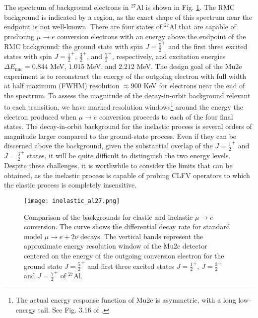 \documentclass{book}[letterpaper,12pt]
\begin{document}
The spectrum of background electrons in $^{27}$Al is shown in Fig. \ref{fig:backgrounds}. The RMC background is indicated by a region, as the exact shape of this spectrum near the endpoint is not well-known. There are four states of $^{27}$Al that are capable of producing $\mu\rightarrow e$ conversion electrons with an energy above the endpoint of the RMC background: the ground state with spin $J=\frac{5}{2}^+$ and the first three excited states with spin $J=\frac{1}{2}^+$, $\frac{3}{2}^+$, and $\frac{7}{2}^+$, respectively, and excitation energies $\Delta E_\mathrm{nuc}=0.844$ MeV, $1.015$ MeV, and $2.212$ MeV. The design goal of the Mu2e experiment is to reconstruct the energy of the outgoing electron with full width at half maximum (FWHM) resolution $\approx 900$ KeV for electrons near the end of the spectrum. To assess the magnitude of the decay-in-orbit background relevant to each transition, we have marked resolution windows\footnote{The actual energy response function of Mu2e is asymmetric, with a long low-energy tail. See Fig. 3.16 of \cite{Mu2e:2014fns}.} around the energy the electron produced when $\mu\rightarrow e$ conversion proceeds to each of the four final states. The decay-in-orbit background for the inelastic process is several orders of magnitude larger compared to the ground-state process. Even if they can be discerned above the background, given the substantial overlap of the $J=\frac{1}{2}^+$ and $J=\frac{3}{2}^+$ states, it will be quite difficult to distinguish the two energy levels. Despite these challenges, it is worthwhile to consider the limits that can be obtained, as the inelastic process is capable of probing CLFV operators to which the elastic process is completely insensitive.
\begin{figure}
\centering
\texttt{[image: inelastic\_al27.png]}
\caption{Comparison of the backgrounds for elastic and inelastic $\mu\rightarrow e$ conversion. The curve shows the differential decay rate for standard model $\mu\rightarrow e+2\nu$ decays. The vertical bands represent the approximate energy resolution window of the Mu2e detector centered on the energy of the outgoing conversion electron for the ground state $J=\frac{5}{2}^+$ and first three excited states $J=\frac{1}{2}^+$, $J=\frac{3}{2}^+$ and $J=\frac{7}{2}^+$ of $^{27}$Al.}
\label{fig:backgrounds}
\end{figure}
 
\end{document}

